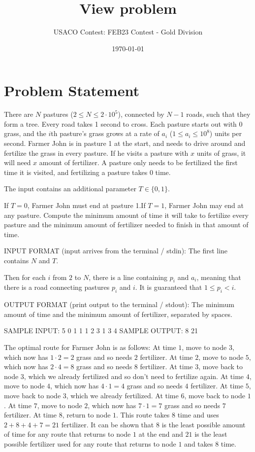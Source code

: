 \documentclass[12pt]{article}
\title{View problem}
\author{USACO Contest: FEB23 Contest - Gold Division}
\date{\today}
\begin{document}
\maketitle

\section*{Problem Statement}


There are $N$ pastures ($2 \le N \le 2\cdot 10^5$), connected by $N-1$ roads,
such that they  form a tree. Every road takes 1 second to cross. Each pasture
starts out with  0 grass, and the $i$th pasture's grass grows at a rate of $a_i$
($1\le a_i\le 10^8$) units per second.  Farmer John is in pasture 1 at the
start, and needs to drive around and fertilize the grass in every pasture.  If
he visits a pasture with $x$ units of  grass, it will need  $x$ amount of
fertilizer. A pasture only needs to be fertilized the first time it is visited,
and fertilizing a pasture takes 0 time.

The input contains an additional parameter $T\in \{0,1\}$. 

If $T=0$, Farmer John must end at pasture 1.If $T=1$, Farmer John may end at any pasture.
Compute the minimum amount of time it will take to fertilize every pasture  and
the minimum amount of fertilizer needed to finish in that amount of time.

INPUT FORMAT (input arrives from the terminal / stdin):
The first line contains $N$ and $T$.

Then for each $i$ from $2$ to $N$, there is a line containing $p_i$ and $a_i$,
meaning that there is a road connecting pastures $p_i$ and $i$. It is guaranteed
that $1\le p_i<i$.

OUTPUT FORMAT (print output to the terminal / stdout):
The minimum amount of time and the minimum amount of fertilizer, separated by
spaces.

SAMPLE INPUT:
5 0
1 1
1 2
3 1
3 4
SAMPLE OUTPUT: 
8 21

The optimal route for Farmer John is as follows:
 At time $1$, move to node $3$, which now has $1 \cdot 2 = 2$ grass and so
needs $2$ fertilizer. At time $2$, move to node $5$, which now has
$2 \cdot 4 = 8$ grass and so needs $8$ fertilizer. At time $3$, move
back to node $3$, which we already fertilized and so don't need to fertilize
again.  At time $4$, move to node $4$, which now has $4 \cdot 1 = 4$
grass and so needs $4$ fertilizer. At time $5$, move back to node $3$,
which we already fertilized.  At time $6$, move back to node $1$.
 At time $7$, move to node $2$, which now has $7 \cdot 1 = 7$ grass
and so needs $7$ fertilizer. At time $8$, return to node $1$. 
This route takes $8$ time and uses $2 + 8 + 4 + 7 = 21$ fertilizer. It can be
shown that $8$ is the least possible amount of time for any route that returns
to node $1$ at the end and $21$ is the least possible fertilizer used for any
route that returns to node $1$ and takes $8$ time. 
\end{document}
